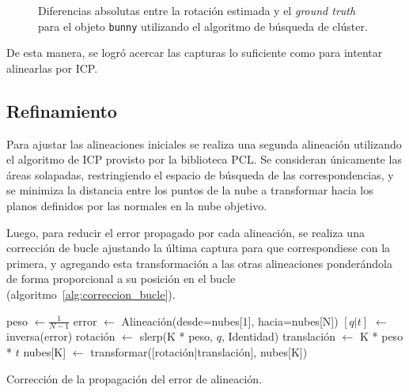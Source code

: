 			\begin{figure}
				
				\caption[Diferencias en la rotación estimada para el objeto \texttt{bunny}]
				{\label{fig:clust_bunny}Diferencias absolutas entre la rotación estimada y el \emph{ground truth} para el objeto \texttt{bunny} utilizando el algoritmo de búsqueda de clúster.}
			\end{figure}

			De esta manera, se logró acercar las capturas lo suficiente como
			para intentar alinearlas por ICP.





	\subsection{Refinamiento}
	Para ajustar las alineaciones iniciales se realiza una segunda alineación utilizando
	el algoritmo de ICP provisto por la biblioteca PCL.
	Se consideran únicamente las áreas solapadas, restringiendo el espacio de
	búsqueda de las correspondencias, y se minimiza la distancia entre los puntos
	de la nube a transformar hacia los planos definidos por las normales en la nube objetivo.

	Luego, para reducir el error propagado por cada alineación, se realiza una
	corrección de bucle ajustando la última captura para que correspondiese con la primera,
	y agregando esta transformación a las otras alineaciones ponderándola de forma
	proporcional a su posición en el bucle (algoritmo~\ref{alg:correccion_bucle}).

	\begin{algorithm}
		\begin{algorithmic}[1]
				\State peso $\gets \frac{1}{N-1}$
				\State error $\gets$ Alineación(desde=nubes[1], hacia=nubes[N])
				\State $[q|t]$ $\gets$ inversa(error)
					\State rotación $\gets$ slerp(K * peso, $q$, Identidad)
					\State translación $\gets$ K * peso * $t$
					\State nubes[K] $\gets$ transformar([rotación|translación], nubes[K])
				\EndFor
			\EndFunction
		\end{algorithmic}
		\caption[Corrección de la propagación del error de alineación]{\label{alg:correccion_bucle}Corrección de la propagación del error de alineación.}
	\end{algorithm}

